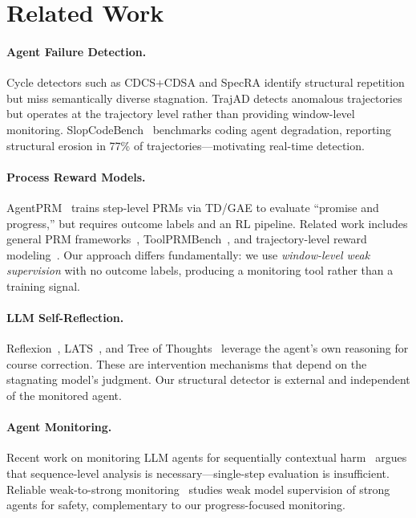 \documentclass[11pt,a4paper]{article}
\begin{document}
\section{Related Work}
\label{sec:related}

\paragraph{Agent Failure Detection.}
Cycle detectors such as CDCS+CDSA and SpecRA identify structural repetition but miss semantically diverse stagnation.
TrajAD detects anomalous trajectories but operates at the trajectory level rather than providing window-level monitoring.
SlopCodeBench~\cite{slopcodebench2026} benchmarks coding agent degradation, reporting structural erosion in 77\% of trajectories---motivating real-time detection.

\paragraph{Process Reward Models.}
AgentPRM~\cite{agentprm2026} trains step-level PRMs via TD/GAE to evaluate ``promise and progress,'' but requires outcome labels and an RL pipeline.
Related work includes general PRM frameworks~\cite{prm_framework2025}, ToolPRMBench~\cite{toolprmbench2026}, and trajectory-level reward modeling~\cite{traj_reward2026}.
Our approach differs fundamentally: we use \emph{window-level weak supervision} with no outcome labels, producing a monitoring tool rather than a training signal.

\paragraph{LLM Self-Reflection.}
Reflexion~\cite{shinn2023reflexion}, LATS~\cite{zhou2023lats}, and Tree of Thoughts~\cite{yao2023tree} leverage the agent's own reasoning for course correction.
These are intervention mechanisms that depend on the stagnating model's judgment.
Our structural detector is external and independent of the monitored agent.

\paragraph{Agent Monitoring.}
Recent work on monitoring LLM agents for sequentially contextual harm~\cite{seqharm2025} argues that sequence-level analysis is necessary---single-step evaluation is insufficient.
Reliable weak-to-strong monitoring~\cite{w2s_monitor2025} studies weak model supervision of strong agents for safety, complementary to our progress-focused monitoring.
\end{document}
